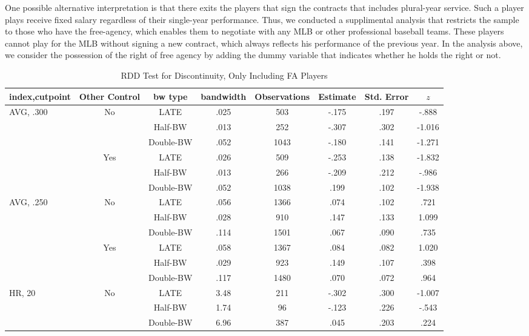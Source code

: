 \documentclass[dvipdfmx, 12pt]{article}
\begin{document}
One possible alternative interpretation is that there exits the players that sign the contracts that includes plural-year service. Such a player plays receive fixed salary regardless of their single-year performance. Thus, we conducted a supplimental analysis that restricts the sample to those who have the free-agency, which enables them to negotiate with any MLB or other professional baseball teams. These players cannot play for the MLB without signing a new contract, which always reflects his performance of the previous year. In the analysis above, we consider the possession of the right of free agency by adding the dummy variable that indicates whether he holds the right or not.

\begin{table}[!]
  \caption{RDD Test for Discontinuity, Only Including FA Players}
  \label{RDD_B}
  \footnotesize
  \centering
  \begin{tabular}{lccccccc}\hline
    index,cutpoint & Other Control & bw type & bandwidth
    & Observations & Estimate & Std. Error & $z$
    \\ \hline \hline
    AVG, .300 & No &LATE & .025 & 503 & -.175 & .197 & -.888 \\
    & &Half-BW &  .013 & 252 & -.307 & .302 & -1.016 \\
    & & Double-BW & .052 & 1043  & -.180 & .141 & -1.271 \\ \cline{3-8}

    & Yes &LATE & .026 & 509 & -.253 & .138 & -1.832 \\
    & &Half-BW &  .013 & 266 & -.209 & .212 & -.986 \\
    & & Double-BW & .052 & 1038  & .199 & .102 & -1.938 \\ \hline

    AVG, .250 & No &LATE & .056 & 1366 & .074 & .102 & .721 \\
    & &Half-BW & .028 & 910 & .147 & .133 & 1.099 \\
    & & Double-BW & .114 & 1501  & .067 & .090 & .735 \\ \cline{3-8}

    & Yes &LATE & .058 & 1367 & .084 & .082 & 1.020 \\
    & &Half-BW & .029 & 923 & .149 & .107 & .398 \\
    & & Double-BW & .117 & 1480  & .070 & .072 & .964 \\ \hline

    HR, 20 & No & LATE & 3.48 & 211 & -.302 & .300 & -1.007 \\
    & & Half-BW & 1.74 & 96 & -.123 & .226 & -.543 \\
    & & Double-BW & 6.96 & 387 & .045 & .203 & .224 \\ \cline{3-8}


\end{tabular}
\end{table}
\end{document}
